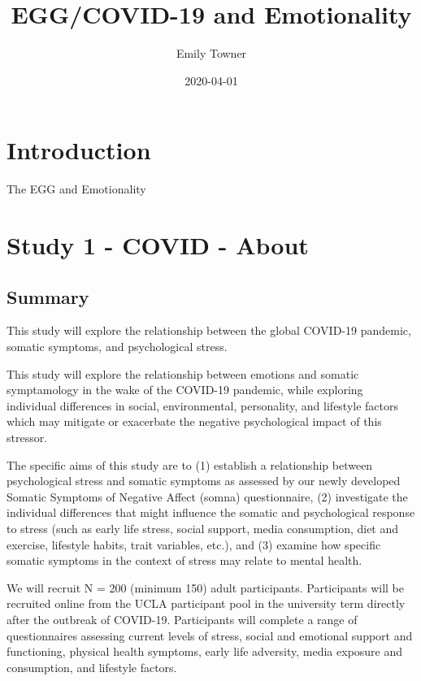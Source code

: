 \documentclass[]{book}
\title{EGG/COVID-19 and Emotionality}
\author{Emily Towner}
\date{2020-04-01}
\begin{document}
\maketitle

{
\setcounter{tocdepth}{1}
\tableofcontents
}
\hypertarget{introduction}{%
\chapter{Introduction}\label{introduction}}

The EGG and Emotionality

\hypertarget{study-1---covid---about}{%
\chapter{Study 1 - COVID - About}\label{study-1---covid---about}}

\hypertarget{summary}{%
\section{Summary}\label{summary}}

This study will explore the relationship between the global COVID-19 pandemic, somatic symptoms, and psychological stress.

This study will explore the relationship between emotions and somatic symptamology in the wake of the COVID-19 pandemic, while exploring individual differences in social, environmental, personality, and lifestyle factors which may mitigate or exacerbate the negative psychological impact of this stressor.

The specific aims of this study are to (1) establish a relationship between psychological stress and somatic symptoms as assessed by our newly developed Somatic Symptoms of Negative Affect (somna) questionnaire, (2) investigate the individual differences that might influence the somatic and psychological response to stress (such as early life stress, social support, media consumption, diet and exercise, lifestyle habits, trait variables, etc.), and (3) examine how specific somatic symptoms in the context of stress may relate to mental health.

We will recruit N = 200 (minimum 150) adult participants. Participants will be recruited online from the UCLA participant pool in the university term directly after the outbreak of COVID-19. Participants will complete a range of questionnaires assessing current levels of stress, social and emotional support and functioning, physical health symptoms, early life adversity, media exposure and consumption, and lifestyle factors.
\end{document}

